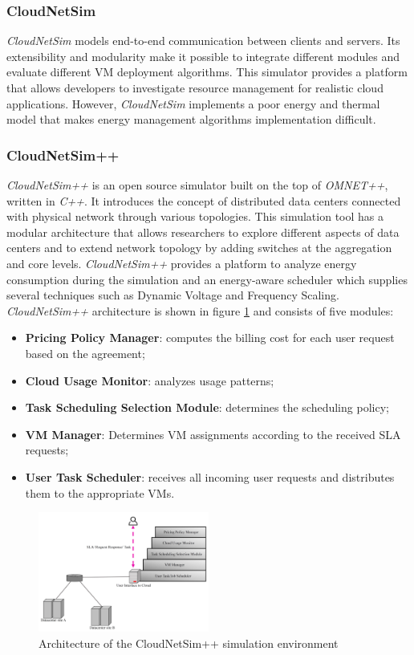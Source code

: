 {\subsubsection*{CloudNetSim}
\emph{CloudNetSim} \cite{cucinotta2013cloudnetsim} models end-to-end communication between clients and servers. Its extensibility and modularity make it possible to integrate different modules and evaluate different VM deployment algorithms. This simulator provides a platform that allows developers to investigate resource management for realistic cloud applications. However, \emph{CloudNetSim} implements a poor energy and thermal model that makes energy management algorithms implementation difficult. \cite{mansouri2020cloud}
\subsubsection{CloudNetSim++}
\emph{CloudNetSim++} \cite{malik2014cloudnetsim++} is an open source simulator built on the top of \emph{OMNET++}, written in \emph{C++}. It introduces the concept of distributed data centers connected with physical network through various topologies. This simulation tool has a modular architecture that allows researchers to explore different aspects of data centers and to extend network topology by adding switches at the aggregation and core levels. \emph{CloudNetSim++} provides a platform to analyze energy consumption during the simulation and an energy-aware scheduler which supplies several techniques such as Dynamic Voltage and Frequency Scaling. 
\emph{CloudNetSim++} architecture is shown in figure \ref{fig:cloudnetsim++_arch} and consists of five modules:
\begin{itemize}
    \item \textbf{Pricing Policy Manager}: computes the billing cost for each user request based on the agreement;
    \item \textbf{Cloud Usage Monitor}: analyzes usage patterns;
    \item \textbf{Task Scheduling Selection Module}: determines the scheduling policy;
    \item \textbf{VM Manager}: Determines VM assignments according to the received SLA requests;
    \item \textbf{User Task Scheduler}: receives all incoming user requests and distributes them to the appropriate VMs.
\end{itemize}
\begin{figure}[h]
    \centering
    \includegraphics[width=0.5\textwidth]{chapters/images/cloudnetsim++_arch.png}
    \caption{Architecture of the CloudNetSim++ simulation environment}
    \label{fig:cloudnetsim++_arch}
\end{figure}
}
